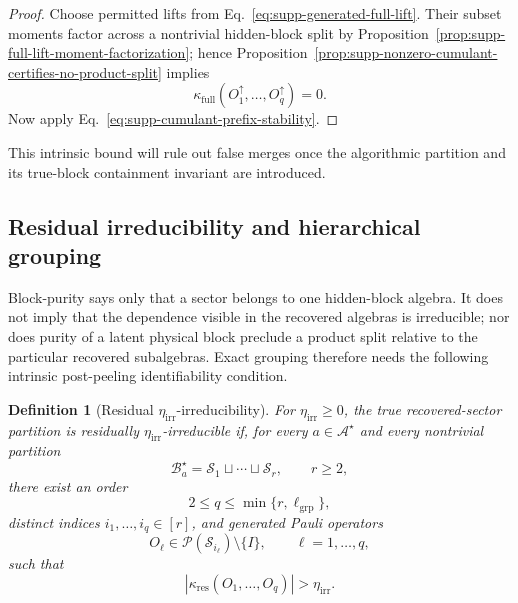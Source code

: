 \documentclass[
  aps,
  prx,
  reprint,
  superscriptaddress,
  amsmath,
  amssymb,
  nofootinbib,
  longbibliography
]{revtex4-2}
\newtheorem{definition}[theorem]{Definition}
\begin{document}
\begin{proof}
Choose permitted lifts from
Eq.~\eqref{eq:supp-generated-full-lift}.  Their subset moments factor across
a nontrivial hidden-block split by
Proposition~\ref{prop:supp-full-lift-moment-factorization}; hence
Proposition~\ref{prop:supp-nonzero-cumulant-certifies-no-product-split}
implies
\begin{equation}
\kappa_{\mathrm{full}}(O_1^\uparrow,\dots,O_q^\uparrow)=0.
\end{equation}
Now apply Eq.~\eqref{eq:supp-cumulant-prefix-stability}.
\end{proof}

This intrinsic bound will rule out false merges once the algorithmic
partition and its true-block containment invariant are introduced.

\subsection{Residual irreducibility and hierarchical grouping}
\label{sec:supp-hierarchical-cumulant-grouping-algorithm}

Block-purity says only that a sector belongs to one hidden-block algebra.  It
does not imply that the dependence visible in the recovered algebras is
irreducible; nor does purity of a latent physical block preclude a product
split relative to the particular recovered subalgebras.  Exact grouping
therefore needs the following intrinsic post-peeling identifiability
condition.

\begin{definition}[Residual $\eta_{\mathrm{irr}}$-irreducibility]
\label{def:supp-eta-irreducible-hidden-blocks}
For $\eta_{\mathrm{irr}}\ge0$, the true recovered-sector partition is
residually $\eta_{\mathrm{irr}}$-irreducible if, for every
$a\in\mathcal A^\star$ and every nontrivial partition
\begin{equation}
\mathcal B_a^\star
=
\mathcal S_1\sqcup\cdots\sqcup\mathcal S_r,
\qquad r\ge 2,
\end{equation}
there exist an order
\begin{equation}
2\le q\le\min\{r,\ell_{\mathrm{grp}}\},
\end{equation}
distinct indices
$i_1,\dots,i_q\in [r]$,
and generated Pauli operators
\begin{equation}
O_\ell
\in
\mathcal P(\mathcal S_{i_\ell})\setminus\{I\},
\qquad
\ell=1,\dots,q,
\end{equation}
such that
\begin{equation}
\left|
\kappa_{\mathrm{res}}(O_1,\dots,O_q)
\right|
>
\eta_{\mathrm{irr}} .
\label{eq:supp-emp-prop-eta-irreducible}
\end{equation}
\end{definition}
\end{document}
